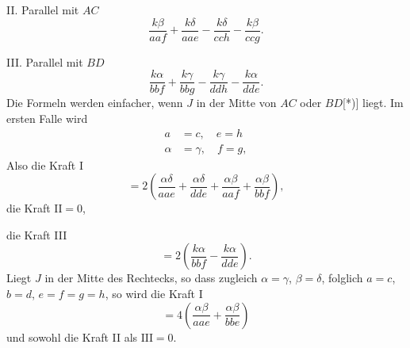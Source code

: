 II. Parallel mit $AC$
\[
\frac{k\beta}{aaf}+\frac{k\delta}{aae}-\frac{k\delta}{cch}-\frac{k\beta}{ccg}.
\]

III. Parallel mit $BD$
\[
\frac{k\alpha}{bbf}+\frac{k\gamma}{bbg}-\frac{k\gamma}{ddh}-\frac{k\alpha}{dde}.
\]
\noindent Die Formeln werden einfacher, wenn $J$ in der Mitte von $AC$ oder $BD$[*)] liegt. Im ersten Falle wird\begingroup\renewcommand{\thefootnote}{}\endgroup
\[
\begin{aligned}
a&=c,\quad e=h\\
\alpha&=\gamma,\quad f=g,
\end{aligned}
\]
\clearpage{}
\noindent Also die Kraft I
\[
=2\left(\frac{\alpha\delta}{aae}+\frac{\alpha\delta}{dde}+\frac{\alpha\beta}{aaf}+\frac{\alpha\beta}{bbf}\right),
\]
\noindent die Kraft $\mathrm{II}=0$,\par\noindent die Kraft III
\[
=2\left(\frac{k\alpha}{bbf}-\frac{k\alpha}{dde}\right).
\]
\noindent Liegt $J$ in der Mitte des Rechtecks, so dass zugleich $\alpha=\gamma$, $\beta=\delta$, folglich $a=c$, $b=d$, $e=f=g=h$, so wird die Kraft I
\[
=4\left(\frac{\alpha\beta}{aae}+\frac{\alpha\beta}{bbe}\right)
\]
\noindent und sowohl die Kraft II als $\mathrm{III}=0$.
\clearpage\endgroup
